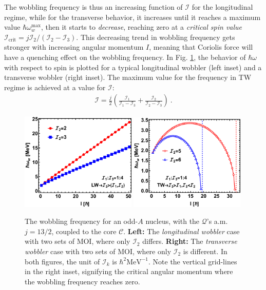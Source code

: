 The wobbling frequency is thus an increasing function of $\mathscr{I}$ for the longitudinal regime, while for the transverse behavior, it increases until it reaches a maximum value $\hbar\omega_w^\text{max}$, then it starts to \emph{decrease}, reaching zero at a \emph{critical spin value} $\mathscr{I}_\text{crit}=j\mathcal{I}_2/(\mathcal{I}_2-\mathcal{I}_3)$. This decreasing trend in wobbling frequency gets stronger with increasing angular momentum $I$, meaning that Coriolis force will have a quenching effect on the wobbling frequency. In Fig. \ref{wobbling-freq-oddA}, the behavior of $\hbar\omega$ with respect to spin is plotted for a typical longitudinal wobbler (left inset) and a transverse wobbler (right inset). The maximum value for the frequency in TW regime is achieved at a value for $\mathscr{I}$:
\begin{align}
    \mathscr{I}=\frac{j}{2}\left(\frac{\mathcal{I}_1}{\mathcal{I}_1-\mathcal{I}_3}+\frac{\mathcal{I}_2}{\mathcal{I}_2-\mathcal{I}_3}\right)\ .
\end{align}
\begin{figure}
    \centering
    \includegraphics[width=0.49\textwidth]{Chapters/Figures/wobb_freq_oddA-LW.pdf}
    \includegraphics[width=0.49\textwidth]{Chapters/Figures/wobb_freq_oddA-TW.pdf}
    \caption{The wobbling frequency for an odd-$A$ nucleus, with the $\mathcal{Q}$'s a.m. $j=13/2$, coupled to the core $\mathscr{C}$. \textbf{Left:} The \emph{longitudinal wobbler} case with two sets of MOI, where only $\mathcal{I}_2$ differs. \textbf{Right:} The \emph{transverse wobbler} case with two sets of MOI, where only $\mathcal{I}_2$ is different. In both figures, the unit of $\mathcal{I}_k$ is $\hbar^2\text{MeV}^{-1}$. Note the vertical grid-lines in the right inset, signifying the critical angular momentum where the wobbling frequency reaches zero.}
    \label{wobbling-freq-oddA}
\end{figure}

